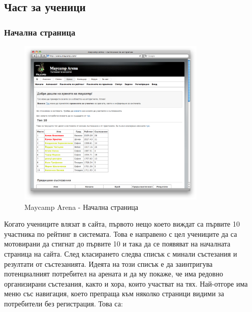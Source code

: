 \documentclass[a4paper,12pt]{article}
\begin{document}
  \subsection{Част за ученици}
  \subsubsection{Начална страница}
  \begin{figure}[ht]
    \begin{center}
      \includegraphics[width=0.8\textwidth]{images/maycamp_arena_home.png}
    \end{center}
    \caption{Maycamp Arena - Начална страница}
    \label{arena_homepage}
  \end{figure}

  Когато учениците влязат в сайта, първото нещо което виждат са първите 10 участника по рейтинг в системата. Това е направено с цел учениците да са мотовирани да стигнат до първите 10 и така да се появяват на началната страница на сайта.
  След класирането следва списък с минали състезания и резултати от състезанията. Идеята на този списък е да заинтригува потенциалният потребител на арената и да му покаже, че има редовно организирани състезания, както и хора, които участват на тях.
  Най-отгоре има меню със навигация, което препраща към няколко страници видими за потребители без регистрация. Това са:
  
\end{document}
